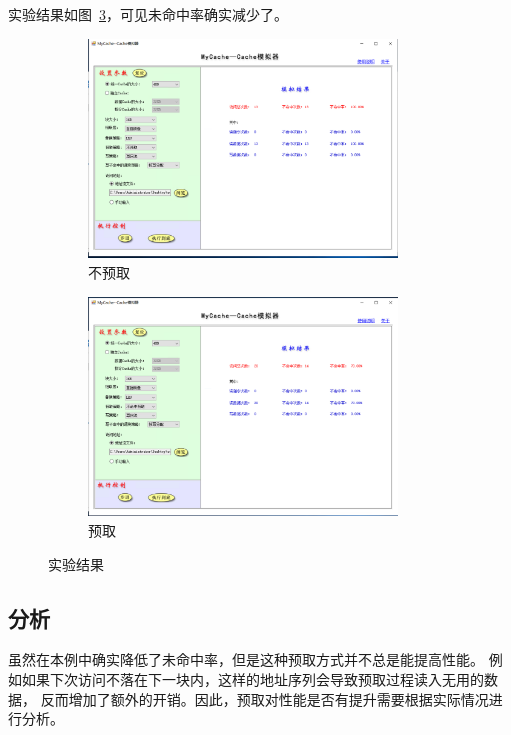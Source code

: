 \documentclass[a4paper,twoside]{article}
\begin{document}
\begin{spacing}{1.2}
实验结果如图~\ref{fig:address}，可见未命中率确实减少了。
\begin{figure}[htb]
	\centering
	\begin{subfigure}{0.4\textwidth}
		\centering
		\caption{不预取}
		\label{fig:p}
		\includegraphics[width=0.9\textwidth]{p.png}
	\end{subfigure}
	\begin{subfigure}{0.4\textwidth}
		\centering
		\caption{预取}
		\label{fig:np}
		\includegraphics[width=0.9\textwidth]{np.png}
	\end{subfigure}
	\caption{实验结果}
	\label{fig:address}
\end{figure}

\subsection{分析}

虽然在本例中确实降低了未命中率，但是这种预取方式并不总是能提高性能。
例如如果下次访问不落在下一块内，这样的地址序列会导致预取过程读入无用的数据，
反而增加了额外的开销。因此，预取对性能是否有提升需要根据实际情况进行分析。


\end{spacing}
\end{document}
